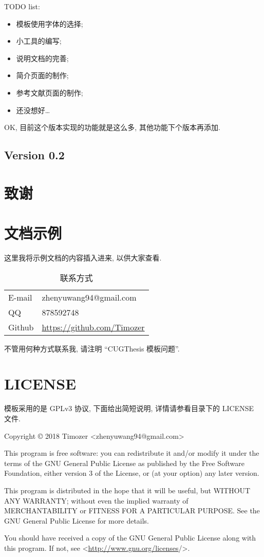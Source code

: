 \documentclass{cugthesis}
\begin{document}
TODO list:
\begin{itemize}
    \item 模板使用字体的选择;
    \item 小工具的编写;
    \item 说明文档的完善;
    \item 简介页面的制作;
    \item 参考文献页面的制作;
    \item 还没想好\dots
\end{itemize}

OK, 目前这个版本实现的功能就是这么多, 其他功能下个版本再添加. 

\section{Version 0.2}
\label{sec:version_0_2}


\backmatter{}
\chapter{致谢}


\appendix
\chapter{文档示例}
\label{chapter:egdoc}

这里我将示例文档的内容插入进来, 以供大家查看.

\begin{table}[htpb]
    \centering
    \caption{联系方式}
    \label{tab:contact}
    \begin{tabular}{>{\sffamily}l>{\ttfamily\small}l}
        \toprule
        E-mail & zhenyuwang94@gmail.com \\
        QQ & 878592748 \\
        Github & \url{https://github.com/Timozer} \\
        \bottomrule 
    \end{tabular}
\end{table}

不管用何种方式联系我, 请注明 ``CUGThesis 模板问题''.

\chapter{LICENSE}
\cugthesis 模板采用的是 GPLv3 协议, 下面给出简短说明, 详情请参看目录下的 LICENSE 文件.

Copyright © 2018 Timozer <zhenyuwang94@gmail.com>

This program is free software: you can redistribute it and/or modify
it under the terms of the GNU General Public License as published by
the Free Software Foundation, either version 3 of the License, or
(at your option) any later version.

This program is distributed in the hope that it will be useful,
but WITHOUT ANY WARRANTY; without even the implied warranty of
MERCHANTABILITY or FITNESS FOR A PARTICULAR PURPOSE.  See the
GNU General Public License for more details.

You should have received a copy of the GNU General Public License
along with this program.  If not, see <\url{http://www.gnu.org/licenses}/>.
\end{document}
